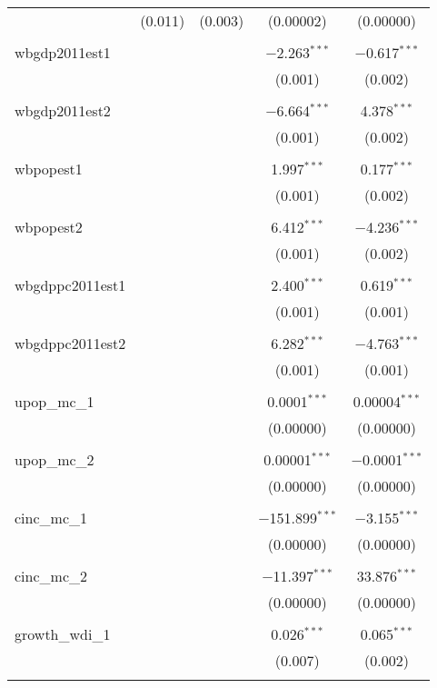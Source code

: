 \begin{table}[!htbp]
\begin{tabular}{@{\extracolsep{5pt}}lcccc}
  & (0.011) & (0.003) & (0.00002) & (0.00000) \\ 
  & & & & \\ 
 wbgdp2011est1 &  &  & $-$2.263$^{***}$ & $-$0.617$^{***}$ \\ 
  &  &  & (0.001) & (0.002) \\ 
  & & & & \\ 
 wbgdp2011est2 &  &  & $-$6.664$^{***}$ & 4.378$^{***}$ \\ 
  &  &  & (0.001) & (0.002) \\ 
  & & & & \\ 
 wbpopest1 &  &  & 1.997$^{***}$ & 0.177$^{***}$ \\ 
  &  &  & (0.001) & (0.002) \\ 
  & & & & \\ 
 wbpopest2 &  &  & 6.412$^{***}$ & $-$4.236$^{***}$ \\ 
  &  &  & (0.001) & (0.002) \\ 
  & & & & \\ 
 wbgdppc2011est1 &  &  & 2.400$^{***}$ & 0.619$^{***}$ \\ 
  &  &  & (0.001) & (0.001) \\ 
  & & & & \\ 
 wbgdppc2011est2 &  &  & 6.282$^{***}$ & $-$4.763$^{***}$ \\ 
  &  &  & (0.001) & (0.001) \\ 
  & & & & \\ 
 upop\_mc\_1 &  &  & 0.0001$^{***}$ & 0.00004$^{***}$ \\ 
  &  &  & (0.00000) & (0.00000) \\ 
  & & & & \\ 
 upop\_mc\_2 &  &  & 0.00001$^{***}$ & $-$0.0001$^{***}$ \\ 
  &  &  & (0.00000) & (0.00000) \\ 
  & & & & \\ 
 cinc\_mc\_1 &  &  & $-$151.899$^{***}$ & $-$3.155$^{***}$ \\ 
  &  &  & (0.00000) & (0.00000) \\ 
  & & & & \\ 
 cinc\_mc\_2 &  &  & $-$11.397$^{***}$ & 33.876$^{***}$ \\ 
  &  &  & (0.00000) & (0.00000) \\ 
  & & & & \\ 
 growth\_wdi\_1 &  &  & 0.026$^{***}$ & 0.065$^{***}$ \\ 
  &  &  & (0.007) & (0.002) \\ 
  & & & & \\ 

\end{tabular}
\end{table}
